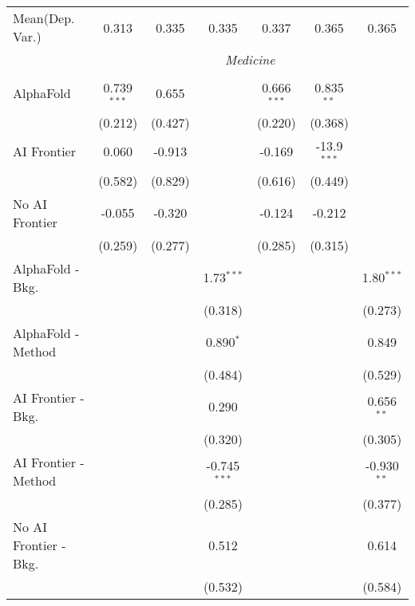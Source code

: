 \begin{tabular}{lcccccc}
Mean(Dep. Var.) & 0.313 & 0.335 & 0.335 & 0.337 & 0.365 & 0.365 \\
 & \multicolumn{6}{c}{\textit{Medicine}} \\ \\
   AlphaFold               & 0.739$^{***}$ & 0.655   &                & 0.666$^{***}$ & 0.835$^{**}$  &   \\   
                           & (0.212)       & (0.427) &                & (0.220)       & (0.368)       &   \\   
   AI Frontier             & 0.060         & -0.913  &                & -0.169        & -13.9$^{***}$ &   \\   
                           & (0.582)       & (0.829) &                & (0.616)       & (0.449)       &   \\   
   No AI Frontier          & -0.055        & -0.320  &                & -0.124        & -0.212        &   \\   
                           & (0.259)       & (0.277) &                & (0.285)       & (0.315)       &   \\   
   AlphaFold - Bkg.        &               &         & 1.73$^{***}$   &               &               & 1.80$^{***}$\\   
                           &               &         & (0.318)        &               &               & (0.273)\\   
   AlphaFold - Method      &               &         & 0.890$^{*}$    &               &               & 0.849\\   
                           &               &         & (0.484)        &               &               & (0.529)\\   
   AI Frontier - Bkg.      &               &         & 0.290          &               &               & 0.656$^{**}$\\   
                           &               &         & (0.320)        &               &               & (0.305)\\   
   AI Frontier - Method    &               &         & -0.745$^{***}$ &               &               & -0.930$^{**}$\\   
                           &               &         & (0.285)        &               &               & (0.377)\\   
   No AI Frontier - Bkg.   &               &         & 0.512          &               &               & 0.614\\   
                           &               &         & (0.532)        &               &               & (0.584)\\   

\end{tabular}
